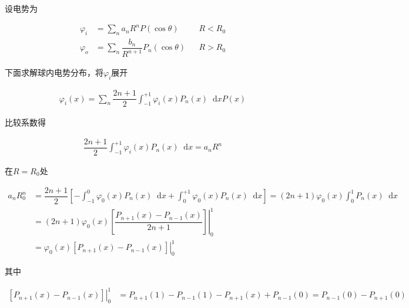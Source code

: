 \documentclass{article}
\newcommand*{\md}{\mathop{}\!\mathrm{d}}
\begin{document}
设电势为

\begin{equation*}
  \begin{aligned}
    \varphi_i &= \sum_n a_n R^n P \left( \cos \theta \right) && R<R_0 \\
    \varphi_o &= \sum_n \dfrac{b_n}{R^{n+1}} P_n \left( \cos \theta \right) && R>R_0 
  \end{aligned}
\end{equation*}

下面求解球内电势分布，将$\varphi_i$展开

\begin{equation*}
  \begin{aligned}
    \varphi_i \left( x \right) = \sum_n \dfrac{2n+1}{2} \int_{-1}^{+1} \varphi_i \left( x \right) P_n \left( x \right) \md x P \left( x \right) 
  \end{aligned}
\end{equation*}

比较系数得

\begin{equation*}
  \begin{aligned}
    \dfrac{2n+1}{2} \int_{-1}^{+1} \varphi_i \left( x \right) P_n \left( x \right) \md x
    = a_n R^n
  \end{aligned}
\end{equation*}

在$R=R_0$处

\begin{equation*}
  \begin{aligned}
    a_n R_0^n &=
    \dfrac{2n+1}{2} \left[ - \int_{-1}^{0} \varphi_0 \left( x \right) P_n \left( x \right) \md x + \int_{0}^{+1} \varphi_0 \left( x \right) P_n \left( x \right) \md x \right]
    = \left( 2n+1 \right) \varphi_0 \left( x \right) \int_0^1 P_n \left( x \right) \md x \\
    &= \left( 2n+1 \right) \varphi_0 \left( x \right) \left. \left[ \dfrac{P_{n+1} \left( x \right) - P_{n-1} \left( x \right)}{2n+1} \right] \right|_0^1 \\
    &= \varphi_0 \left( x \right) \left. \left[  P_{n+1} \left( x \right) - P_{n-1} \left( x \right) \right] \right|_0^1
  \end{aligned}
\end{equation*}

其中

\begin{equation*}
  \begin{aligned}
    \left. \left[  P_{n+1} \left( x \right) - P_{n-1} \left( x \right) \right] \right|_0^1
    &= P_{n+1} \left( 1 \right) - P_{n-1} \left( 1 \right) - P_{n+1} \left( x \right) + P_{n-1} \left( 0 \right) = P_{n-1} \left( 0 \right) - P_{n+1} \left( 0 \right) 
  \end{aligned}
\end{equation*}
\end{document}
